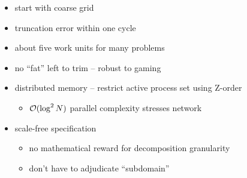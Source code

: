 \documentclass[aspectratio=169]{beamer}
\begin{document}
\begin{frame}[fragile]
\begin{figure}
\label{fig:FMG}
\end{figure}
\begin{itemize}
  \item start with coarse grid
  \item truncation error within one cycle
  \item about five work units for many problems
  \item no ``fat'' left to trim -- robust to gaming
  \item distributed memory -- restrict active process set using Z-order
    \begin{itemize}
    \item $\mathcal{O}(\log^2 N)$ parallel complexity stresses network
    \end{itemize}
  \item scale-free specification
    \begin{itemize}
    \item no mathematical reward for decomposition granularity
    \item don't have to adjudicate ``subdomain''
    \end{itemize}
\end{itemize}
\end{frame}
\end{document}
